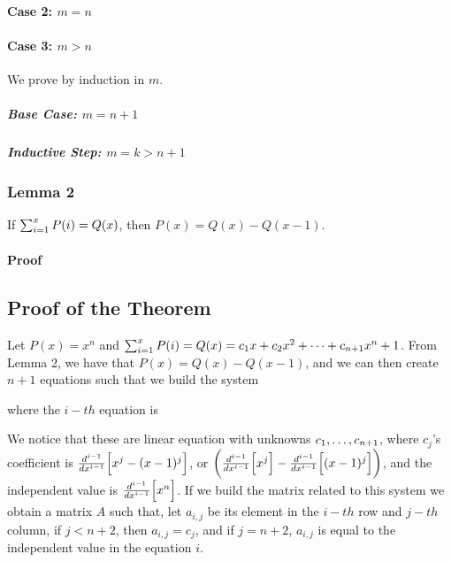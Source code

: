 \documentclass[a4paper, 10pt]{article}
\begin{document}
\lemmaOneCaseOneInduction
\paragraph{Case 2: $m = n$}

\lemmaOneCaseTwo
\paragraph{Case 3: $m > n$}
 
We prove by induction in $m$.

\subparagraph{Base Case: $m = n + 1$}

\lemmaOneCaseThreeBase

\subparagraph{Inductive Step: $m = k > n + 1$}

\lemmaOneCaseThreeInduction
 
\pagebreak
\subsubsection{Lemma 2}

If $\sum_{i=1}^{x}P(i) = Q(x)$, then $P(x) = Q(x) - Q(x-1)$.

\paragraph{Proof}

\lemmaTwo

\pagebreak

\subsection{Proof of the Theorem}

Let $P(x) = x^n$ and $\sum_{i=1}^{x}P(i) = Q(x) = c_1x + c_2x^2 + \cdots + c_{n+1}x^n+1$. From Lemma 2, we have that $P(x) = Q(x) - Q(x-1)$, and we can then create $n+1$ equations such that we build the system

\diffEquationSystem

where the $i-th$ equation is

\ithEquation

We notice that these are linear equation with unknowns $c_1,\ldots,c_{n+1}$, where $c_j$'s coefficient is $\frac{d^{i-1}}{dx^{i-1}}\Big[x^j - (x - 1)^j\Big]$, or $\bigg(\frac{d^{i-1}}{dx^{i-1}}\Big[x^j\Big] - \frac{d^{i-1}}{dx^{i-1}}\Big[(x - 1)^j\Big]\bigg)$, and the independent value is $\frac{d^{i-1}}{dx^{i-1}}\Big[x^n\Big]$. If we build the matrix related to this system we obtain a matrix $A$ such that, let $a_{i,j}$ be its element in the $i-th$ row and $j-th$ column, if $j < n + 2$, then $a_{i,j} = c_j$, and if $j = n+2$, $a_{i,j}$ is equal to the independent value in the equation $i$.\\
\end{document}
